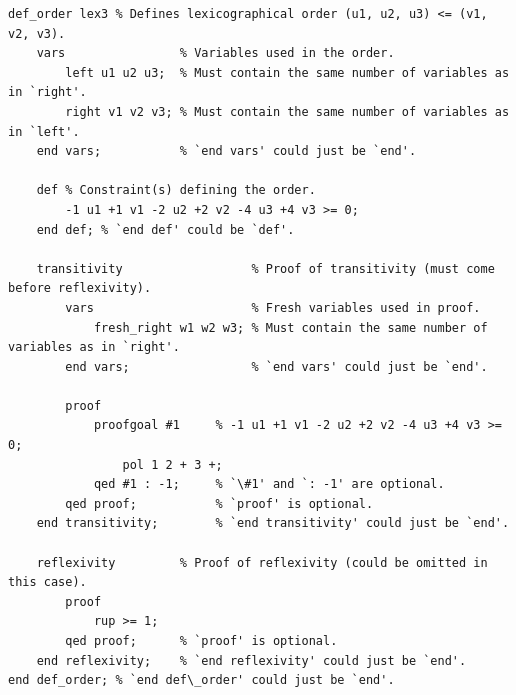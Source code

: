 \documentclass[a4paper]{article}
\begin{document}
\begin{lstlisting}[language=veripb]
def_order lex3 % Defines lexicographical order (u1, u2, u3) <= (v1, v2, v3).
	vars                % Variables used in the order.
		left u1 u2 u3;  % Must contain the same number of variables as in `right'.
		right v1 v2 v3; % Must contain the same number of variables as in `left'.
	end vars;           % `end vars' could just be `end'.

	def % Constraint(s) defining the order.
		-1 u1 +1 v1 -2 u2 +2 v2 -4 u3 +4 v3 >= 0;
	end def; % `end def' could be `def'.

	transitivity                  % Proof of transitivity (must come before reflexivity).
		vars                      % Fresh variables used in proof.
			fresh_right w1 w2 w3; % Must contain the same number of variables as in `right'.
		end vars;                 % `end vars' could just be `end'.

		proof
			proofgoal #1     % -1 u1 +1 v1 -2 u2 +2 v2 -4 u3 +4 v3 >= 0;
				pol 1 2 + 3 +;
			qed #1 : -1;     % `\#1' and `: -1' are optional.
		qed proof;           % `proof' is optional.
	end transitivity;        % `end transitivity' could just be `end'.

	reflexivity         % Proof of reflexivity (could be omitted in this case).
		proof
			rup >= 1;
		qed proof;      % `proof' is optional.
	end reflexivity;    % `end reflexivity' could just be `end'.
end def_order; % `end def\_order' could just be `end'.
\end{lstlisting}
\end{document}

